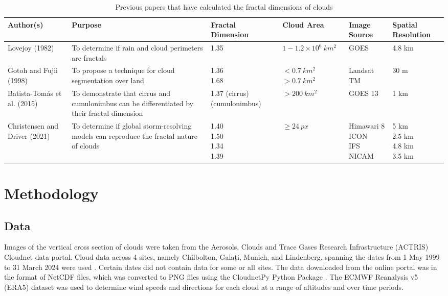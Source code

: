 \documentclass[titlepage]{article}
\begin{document}
\begin{table}[H]
    \begin{tabularx}{\textwidth}{*{6}{X}}
        \toprule
        Author(s) & Purpose & Fractal Dimension & Cloud Area & Image Source & Spatial Resolution\\
        \toprule
        Lovejoy (1982) & To determine if rain and cloud perimeters are fractals & 1.35 & \(1-1.2\times10^6\ km ^2\) & GOES & 4.8 km\\
        \hline
        Gotoh and Fujii (1998) & To propose a technique for cloud segmentation over land & \makecell[lt]{1.36\\1.68} & \makecell[lt]{\(<0.7\ km^2\)\\\(>0.7\ km^2\)} & Landsat TM & 30 m\\
        \hline
        Batista-Tomás et al. (2015) & To demonstrate that cirrus and cumulonimbus can be differentiated by their fractal dimension & 1.37 (cirrus)\newline1.18 (cumulonimbus) & \(>200 \ km^2\) & GOES 13 & 1 km\\
        \hline
        Christensen and Driver (2021) & To determine if global storm-resolving models can reproduce the fractal nature of clouds & \makecell[lt]{1.40\\1.50\\1.34\\1.39} & \(\geqslant 24\ px\) & \makecell[lt]{Himawari 8\\ICON\\IFS\\NICAM} & \makecell[lt]{5 km\\2.5 km \\4.8 km\\3.5 km}\\
        \bottomrule
    \end{tabularx}
    \caption{Previous papers that have calculated the fractal dimensions of clouds \cite{lovejoy1982area, gotoh1998fractal, batista2016classification, christensen2021fractal}}
    \label{tab:my_label}
\end{table}

\section{Methodology}

\subsection{Data}

Images of the vertical cross section of clouds were taken from the Aerosols, Clouds and Trace Gases Research Infrastructure (ACTRIS) Cloudnet data portal. Cloud data across 4 sites, namely Chilbolton, Galați, Munich, and Lindenberg, spanning the dates from 1 May 1999 to 31 March 2024 were used \cite{constantin2024, grsdorf2024}. Certain dates did not contain data for some or all sites. The data downloaded from the online portal was in the format of NetCDF files, which was converted to PNG files using the CloudnetPy Python Package \cite{Tukiainen2020}. The ECMWF Reanalysis v5 (ERA5) dataset was used to determine wind speeds and directions for each cloud at a range of altitudes and over time periods.
\end{document}
